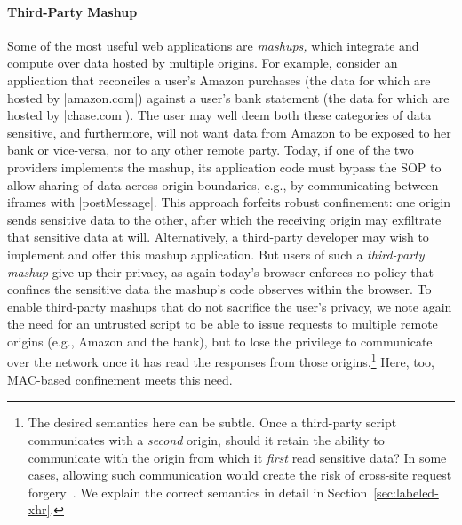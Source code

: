
\paragraph{Third-Party Mashup}
Some of the most useful web applications are {\em mashups,} which
integrate and compute over data hosted by multiple origins. For
example, consider an application that reconciles a user's Amazon
purchases (the data for which are hosted by \js|amazon.com|) against a
user's bank statement (the data for which are hosted by
\js|chase.com|). The user may well deem both these categories of data
sensitive, and furthermore, will not want data from Amazon to be
exposed to her bank or vice-versa, nor to any other remote
party. Today, if one of the two providers implements the mashup, its
application code must bypass the SOP to allow sharing of data across
origin boundaries, e.g., by communicating between iframes with
\js|postMessage|. This approach forfeits robust confinement: one
origin sends sensitive data to the other, after which the receiving
origin may exfiltrate that sensitive data at will. 
Alternatively, a
third-party developer may wish to implement and offer this mashup
application. But users of such a {\em third-party mashup} give up
their privacy, as again today's browser enforces no policy that
confines the sensitive data the mashup's code observes within the
browser. To enable third-party mashups that do not sacrifice the
user's privacy, we note again the need for an untrusted script to be
able to issue requests to multiple remote origins (e.g., Amazon and
the bank), but to lose the privilege to communicate over the network
once it has read the responses from those origins.\footnote{The
  desired semantics here can be subtle. Once a third-party script
  communicates with a \emph{second} origin, should it retain the
  ability to communicate with the origin from which it \emph{first}
  read sensitive data? In some cases, allowing such communication
  would create the risk of cross-site request
  forgery~. We explain the correct semantics in detail in
  Section~\ref{sec:labeled-xhr}.}  Here, too, MAC-based confinement meets this need.

